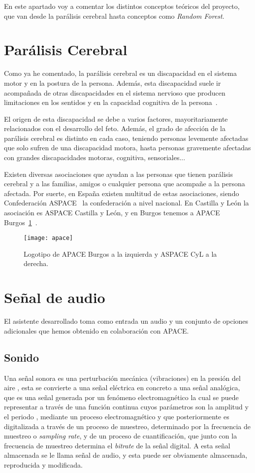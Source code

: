 
En este apartado voy a comentar los distintos conceptos teóricos del proyecto, que van desde la parálisis cerebral hasta conceptos como \textit{Random Forest}.

\section{Parálisis Cerebral}
Como ya he comentado, la parálisis cerebral es un discapacidad en el sistema motor y en la postura de la persona. Además, esta discapacidad suele ir acompañada de otras discapacidades en el sistema nervioso que producen limitaciones en los sentidos y en la capacidad cognitiva de la persona~\cite{rosenbaum2007report,aspacecyl}.

El origen de esta discapacidad se debe a varios factores, mayoritariamente relacionados con el desarrollo del feto. Además, el grado de afección de la parálisis cerebral es distinto en cada caso, teniendo personas levemente afectadas que solo sufren de una discapacidad motora, hasta personas gravemente afectadas con grandes discapacidades motoras, cognitiva, sensoriales...

Existen diversas asociaciones que ayudan a las personas que tienen parálisis cerebral y a las familias, amigos o cualquier persona que acompañe a la persona afectada. Por suerte, en España existen multitud de estas asociaciones, siendo Confederación ASPACE~\cite{aspace} la confederación a nivel nacional. En Castilla y León la asociación es ASPACE Castilla y León, y en Burgos tenemos a APACE Burgos~\ref{fig:apace}~\cite{apace}.
\begin{figure}
	\centering
	\texttt{[image: apace]}
	\caption{Logotipo de APACE Burgos a la izquierda y ASPACE CyL a la derecha.}
	\label{fig:apace}
\end{figure}
\section{Señal de audio}
El asistente desarrollado toma como entrada un audio y un conjunto de opciones adicionales que hemos obtenido en colaboración con APACE.
\subsection{Sonido}
Una señal sonora es una  perturbación mecánica (vibraciones) en la presión del aire \cite{pierce1995senales}, esta se convierte a una señal eléctrica en concreto a una señal analógica, que es una señal generada por un fenómeno electromagnético la cual se puede representar a través de una función continua cuyos parámetros son la amplitud y el periodo \cite{analogica}, mediante un proceso electromagnético y que posteriormente es digitalizada a través de un proceso de muestreo, determinado por la frecuencia de muestreo o \textit{sampling rate}, y de un proceso de cuantificación, que junto con la frecuencia de muestreo determina el \textit{bitrate} de la señal digital. A esta señal almacenada se le llama señal de audio, y esta puede ser obviamente almacenada, reproducida y modificada.
